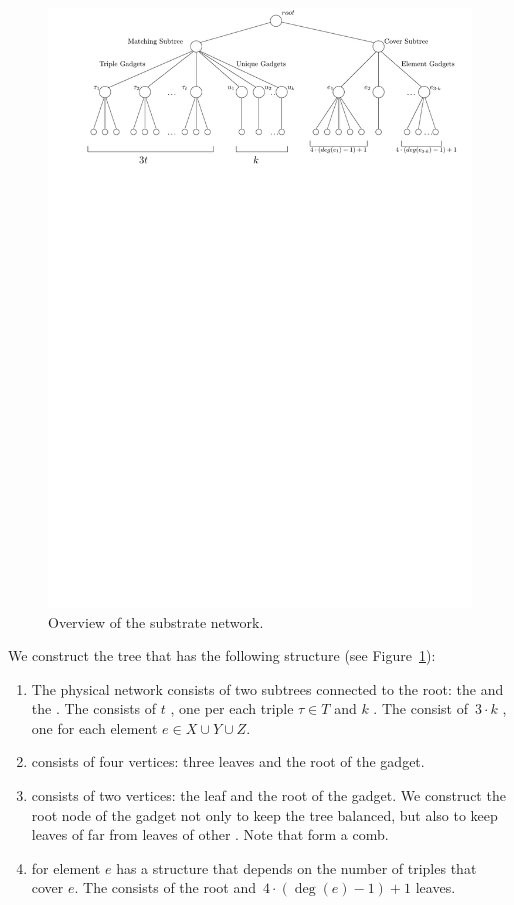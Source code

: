 \begin{figure}[t]
  \centering
  \includegraphics[width=0.9\columnwidth]{figs/static-mapping/overview}
  \caption{Overview of the substrate network.}
  \label{fig:red-ma2}
\end{figure}


We construct the tree that has the following structure (see Figure~\ref{fig:red-ma2}):

\begin{enumerate}
  \item The physical network consists of two subtrees connected to the
  root: the {\MatchSubtree} and the {\CoverSubtree}. The
  {\MatchSubtree} consists of $t$ {\TripleGadgets}, one per each triple $\tau\in T$ and $k$
  {\UnqGadgets}. The {\CoverSubtree} consist of~$3\cdot k$ {\ElGadgets}, one for each element $e\in X\cup Y\cup Z$.
  \item {\TripleGadget} consists of four vertices: three leaves and the root of the gadget.
  \item {\UnqGadget} consists of two vertices: the leaf and the root of the gadget.
  We construct the root node of the gadget not only to keep the tree balanced, but also to keep leaves of
  {\UnqGadgets} far from leaves of other \UnqGadgets. Note that \UnqGadgets{} form a comb.
  \item {\ElGadget} for element $e$ has a structure that depends on the number of triples that cover $e$. The {\ElGadget} consists of the
  root and~$4\cdot(\deg(e)-1)+1$ leaves.
\end{enumerate}

